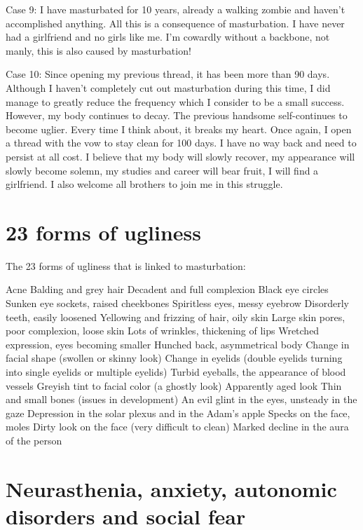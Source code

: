 \documentclass[
]{book}
\begin{document}
Case 9: I have masturbated for 10 years, already a walking zombie and haven't accomplished anything. All this is a consequence of masturbation. I have never had a girlfriend and no girls like me. I'm cowardly without a backbone, not manly, this is also caused by masturbation!

Case 10: Since opening my previous thread, it has been more than 90 days. Although I haven't completely cut out masturbation during this time, I did manage to greatly reduce the frequency which I consider to be a small success. However, my body continues to decay. The previous handsome self-continues to become uglier. Every time I think about, it breaks my heart. Once again, I open a thread with the vow to stay clean for 100 days. I have no way back and need to persist at all cost. I believe that my body will slowly recover, my appearance will slowly become solemn, my studies and career will bear fruit, I will find a girlfriend. I also welcome all brothers to join me in this struggle.

\hypertarget{forms-of-ugliness}{%
\section{23 forms of ugliness}\label{forms-of-ugliness}}

The 23 forms of ugliness that is linked to masturbation:

Acne
Balding and grey hair
Decadent and full complexion
Black eye circles
Sunken eye sockets, raised cheekbones
Spiritless eyes, messy eyebrow
Disorderly teeth, easily loosened
Yellowing and frizzing of hair, oily skin
Large skin pores, poor complexion, loose skin
Lots of wrinkles, thickening of lips
Wretched expression, eyes becoming smaller
Hunched back, asymmetrical body
Change in facial shape (swollen or skinny look)
Change in eyelids (double eyelids turning into single eyelids or multiple eyelids)
Turbid eyeballs, the appearance of blood vessels
Greyish tint to facial color (a ghostly look)
Apparently aged look
Thin and small bones (issues in development)
An evil glint in the eyes, unsteady in the gaze
Depression in the solar plexus and in the Adam's apple
Specks on the face, moles
Dirty look on the face (very difficult to clean)
Marked decline in the aura of the person

\hypertarget{neurasthenia-anxiety-autonomic-disorders-and-social-fear}{%
\section{Neurasthenia, anxiety, autonomic disorders and social fear}\label{neurasthenia-anxiety-autonomic-disorders-and-social-fear}}
\end{document}

